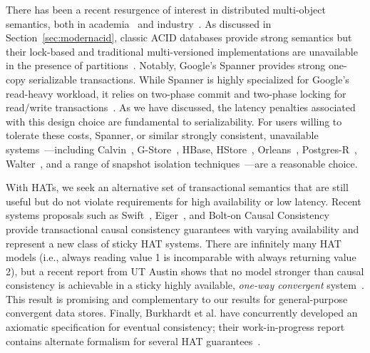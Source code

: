 There has been a recent resurgence of interest in distributed
multi-object semantics, both in academia~\cite{kraska-s3, gstore,
  eiger, walter,calvin, swift} and industry~\cite{orleans,spanner}. As
discussed in Section~\ref{sec:modernacid}, classic ACID databases
provide strong semantics but their lock-based and traditional
multi-versioned implementations are unavailable in the presence of
partitions~\cite{bernstein-book, gray-isolation}. Notably, Google's
Spanner provides strong one-copy serializable transactions. While
Spanner is highly specialized for Google's read-heavy workload, it
relies on two-phase commit and two-phase locking for read/write
transactions~\cite{spanner}. As we have discussed, the latency
penalties associated with this design choice are fundamental to
serializability. For users willing to tolerate these costs, Spanner,
or similar strongly consistent, unavailable
systems~\cite{kemme-classification}---including Calvin~\cite{calvin},
G-Store~\cite{gstore}, HBase, HStore~\cite{hstore},
Orleans~\cite{orleans}, Postgres-R~\cite{kemme-thesis},
Walter~\cite{walter}, and a range of snapshot isolation
techniques~\cite{daudjee-session, daudjee-snapshot}---are a reasonable
choice.

With HATs, we seek an alternative set of transactional semantics that
are still useful but do not violate requirements for high availability
or low latency. Recent systems proposals such as Swift~\cite{swift},
Eiger~\cite{eiger}, and Bolt-on Causal Consistency~\cite{bolton}
provide transactional causal consistency guarantees with varying
availability and represent a new class of sticky HAT systems. There
are infinitely many HAT models (i.e., always reading value 1 is
incomparable with always returning value 2), but a recent report from
UT Austin shows that no model stronger than causal consistency is
achievable in a sticky highly available, \textit{one-way convergent}
system~\cite{cac}. This result is promising and complementary to our
results for general-purpose convergent data stores. Finally, Burkhardt
et al. have concurrently developed an axiomatic specification for
eventual consistency; their work-in-progress report contains alternate
formalism for several HAT guarantees~\cite{burkhardt-txns}.






